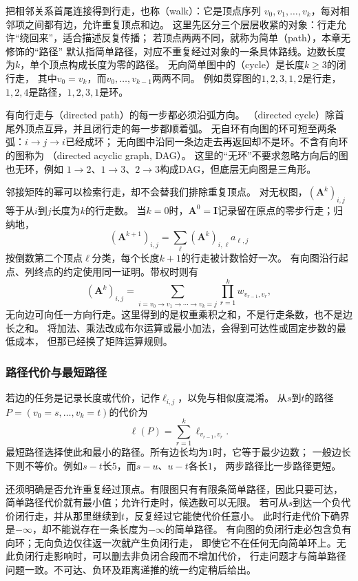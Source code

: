 把相邻关系首尾连接得到行走，也称（walk）：它是顶点序列
\(v_0,v_1,\ldots,v_k\)，每对相邻项之间都有边，允许重复顶点和边。
这里先区分三个层层收紧的对象：行走允许“绕回来”，适合描述反复传播；
若顶点两两不同，就称为简单（path），本章无修饰的“路径”
默认指简单路径，对应不重复经过对象的一条具体路线。边数长度为\(k\)，单个顶点构成长度为零的路径。
无向简单图中的（cycle）是长度\(k\geq3\)的闭行走，
其中\(v_0=v_k\)，而\(v_0,\ldots,v_{k-1}\)两两不同。
例如贯穿图的\(1,2,3,1,2\)是行走，\(1,2,4\)是路径，\(1,2,3,1\)是环。

有向行走与（directed path）的每一步都必须沿弧方向。
（directed cycle）除首尾外顶点互异，并且闭行走的每一步都顺着弧。
无自环有向图的环可短至两条弧：\(i\to j\to i\)已经成环；
无向图中沿同一条边走去再返回却不是环。不含有向环的图称为
（directed acyclic graph, DAG）。
这里的“无环”不要求忽略方向后的图也无环，例如
\(1\to2\)、\(1\to3\)、\(2\to3\)构成DAG，但底层无向图是三角形。

邻接矩阵的幂可以检索行走，却不会替我们排除重复顶点。
对无权图，\((\bm A^k)_{i,j}\)等于从\(i\)到\(j\)长度为\(k\)的行走数。
当\(k=0\)时，\(\bm A^0=\bm I\)记录留在原点的零步行走；归纳地，
\[
  (\bm A^{k+1})_{i,j}=\sum_\ell(\bm A^k)_{i,\ell}a_{\ell,j}
\]
按倒数第二个顶点\(\ell\)分类，每个长度\(k+1\)的行走被计数恰好一次。
有向图沿行起点、列终点的约定使用同一证明。带权时则有
\[
  (\bm A^k)_{i,j}
  =\sum_{i=v_0\to v_1\to\cdots\to v_k=j}
    \prod_{r=1}^{k}w_{v_{r-1},v_r},
\]
无向边可向任一方向行走。这里得到的是权重乘积之和，不是行走条数，也不是边长之和。
将加法、乘法改成布尔运算或最小加法，会得到可达性或固定步数的最低成本，
但那已经换了矩阵运算规则。

\subsubsection{路径代价与最短路径}

若边的任务是记录长度或代价，记作\(\ell_{i,j}\)，以免与相似度混淆。
从\(s\)到\(t\)的路径\(P=(v_0=s,\ldots,v_k=t)\)的代价为
\[
  \ell(P)=\sum_{r=1}^{k}\ell_{v_{r-1},v_r}.
\]
最短路径选择使此和最小的路径。所有边长均为\(1\)时，它等于最少边数；
一般边长下则不等价。例如\(s-t\)长\(5\)，而\(s-u\)、\(u-t\)各长\(1\)，
两步路径比一步路径更短。

还须明确是否允许重复经过顶点。有限图只有有限条简单路径，因此只要可达，
简单路径代价就有最小值；允许行走时，候选数可以无限。
若可从\(s\)到达一个负代价闭行走，并从那里继续到\(t\)，反复经过它能使代价任意小。
此时行走代价下确界是\(-\infty\)，却不能说存在一条长度为\(-\infty\)的简单路径。
有向图的负闭行走必包含负有向环；无向负边仅往返一次就产生负闭行走，
即使它不在任何无向简单环上。无此负闭行走影响时，可以删去非负闭合段而不增加代价，
行走问题才与简单路径问题一致。不可达、负环及距离递推的统一约定稍后给出。

